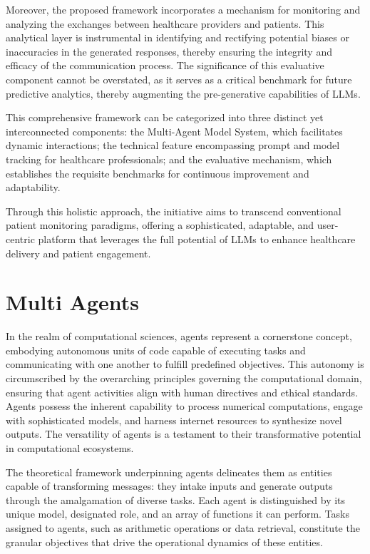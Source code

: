 \documentclass{article}
\begin{document}
Moreover, the proposed framework incorporates a mechanism for monitoring and analyzing the exchanges between healthcare providers and patients. This analytical layer is instrumental in identifying and rectifying potential biases or inaccuracies in the generated responses, thereby ensuring the integrity and efficacy of the communication process. The significance of this evaluative component cannot be overstated, as it serves as a critical benchmark for future predictive analytics, thereby augmenting the pre-generative capabilities of LLMs.

This comprehensive framework can be categorized into three distinct yet interconnected components: the Multi-Agent Model System, which facilitates dynamic interactions; the technical feature encompassing prompt and model tracking for healthcare professionals; and the evaluative mechanism, which establishes the requisite benchmarks for continuous improvement and adaptability.

Through this holistic approach, the initiative aims to transcend conventional patient monitoring paradigms, offering a sophisticated, adaptable, and user-centric platform that leverages the full potential of LLMs to enhance healthcare delivery and patient engagement.

\section{Multi Agents}

In the realm of computational sciences, agents represent a cornerstone concept, embodying autonomous units of code capable of executing tasks and communicating with one another to fulfill predefined objectives. This autonomy is circumscribed by the overarching principles governing the computational domain, ensuring that agent activities align with human directives and ethical standards. Agents possess the inherent capability to process numerical computations, engage with sophisticated models, and harness internet resources to synthesize novel outputs. The versatility of agents is a testament to their transformative potential in computational ecosystems.

The theoretical framework underpinning agents delineates them as entities capable of transforming messages: they intake inputs and generate outputs through the amalgamation of diverse tasks. Each agent is distinguished by its unique model, designated role, and an array of functions it can perform. Tasks assigned to agents, such as arithmetic operations or data retrieval, constitute the granular objectives that drive the operational dynamics of these entities.
\end{document}
